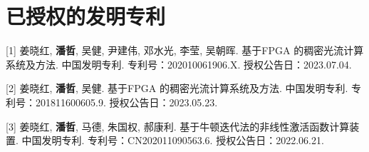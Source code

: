 \section*{已授权的发明专利}

[1] 姜晓红, \textbf{潘哲}, 吴健, 尹建伟, 邓水光, 李莹, 吴朝晖. 基于FPGA 的稠密光流计算系统及方法. 中国发明专利. 专利号：202010061906.X. 授权公告日：2023.07.04.

[2] 姜晓红, \textbf{潘哲}, 吴健. 基于FPGA 的稠密光流计算系统及方法. 中国发明专利. 专利号：201811600605.9. 授权公告日：2023.05.23.

[3] 姜晓红, \textbf{潘哲}, 马德, 朱国权, 郝康利. 基于牛顿迭代法的非线性激活函数计算装置. 中国发明专利. 专利号：CN202011090563.6. 授权公告日：2022.06.21.






